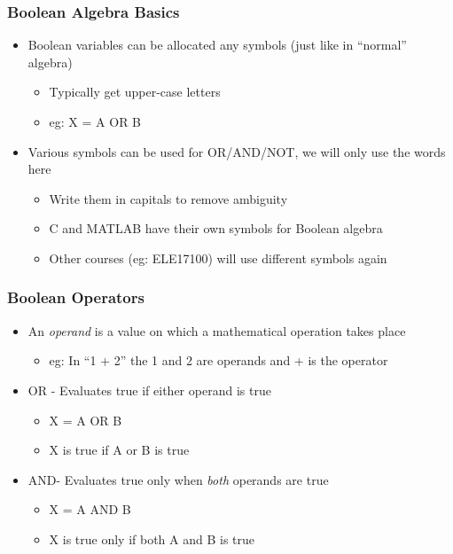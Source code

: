 \documentclass[14pt]{beamer}
\begin{document}
\begin{frame} %
\frametitle{Boolean Algebra Basics}
\begin{itemize}
\item Boolean variables can be allocated any symbols (just like in ``normal'' algebra)
	\begin{itemize}
		\item Typically get upper-case letters
		\item eg: X = A OR B
	\end{itemize}
\item Various symbols can be used for OR/AND/NOT, we will only use the words here
	\begin{itemize}
		\item Write them in capitals to remove ambiguity
		\item C and MATLAB have their own symbols for Boolean algebra
		\item Other courses (eg: ELE17100) will use different symbols again
	\end{itemize}
\end{itemize}
\end{frame}

\begin{frame} %
\frametitle{Boolean Operators}
\begin{itemize}
\item An \textit{operand} is a value on which a mathematical operation takes place
	\begin{itemize}
		\item eg: In ``1 + 2'' the 1 and 2 are operands and + is the operator
	\end{itemize}
\item OR - Evaluates true if either operand is true
	\begin{itemize}
		\item X = A OR B
		\item X is true if A or B is true
	\end{itemize}
\item AND- Evaluates true only when \textit{both} operands are true
	\begin{itemize}
		\item X = A AND B
		\item X is true only if both A and B is true
	\end{itemize}
\end{itemize}
\end{frame}
\end{document}
